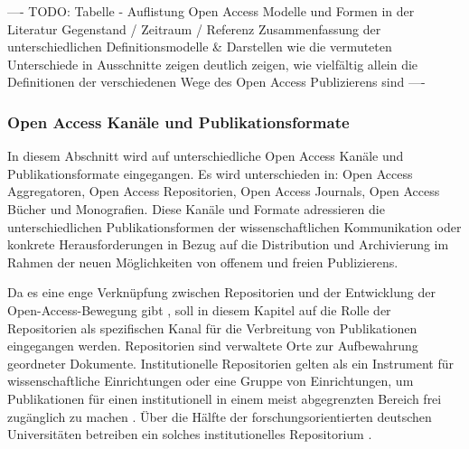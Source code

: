 ---- TODO: Tabelle - Auflistung Open Access  Modelle und Formen in der Literatur
Gegenstand / Zeitraum / Referenz Zusammenfassung der unterschiedlichen Definitionsmodelle & Darstellen wie die vermuteten Unterschiede in Ausschnitte zeigen deutlich zeigen, wie vielfältig allein die Definitionen der verschiedenen Wege des Open Access Publizierens sind ----

\subsubsection{Open Access Kanäle und Publikationsformate}

In diesem Abschnitt wird auf unterschiedliche Open Access Kanäle und Publikationsformate eingegangen. Es wird unterschieden in: Open Access Aggregatoren, Open Access Repositorien, Open Access Journals, Open Access Bücher und Monografien. Diese Kanäle und Formate adressieren die unterschiedlichen Publikationsformen der wissenschaftlichen Kommunikation oder konkrete Herausforderungen in Bezug auf die Distribution und Archivierung im Rahmen der neuen Möglichkeiten von offenem und freien Publizierens.

Da es eine enge Verknüpfung zwischen Repositorien und der Entwicklung der Open-Access-Bewegung gibt \cite{adema_2013_political} \cite{offhaus_2012_institutionelle_repos}, soll in diesem Kapitel auf die Rolle der Repositorien als spezifischen Kanal für die Verbreitung von Publikationen eingegangen werden. Repositorien sind verwaltete Orte zur Aufbewahrung geordneter Dokumente. Institutionelle Repositorien gelten als ein Instrument für wissenschaftliche Einrichtungen oder eine Gruppe von Einrichtungen, um Publikationen für einen institutionell in einem meist abgegrenzten Bereich frei zugänglich zu machen \cite{dobratz_2007_open} \cite{Baggs_2006}. Über die Hälfte der forschungsorientierten deutschen Universitäten betreiben ein solches institutionelles Repositorium \cite{Schmidt_2009}.

